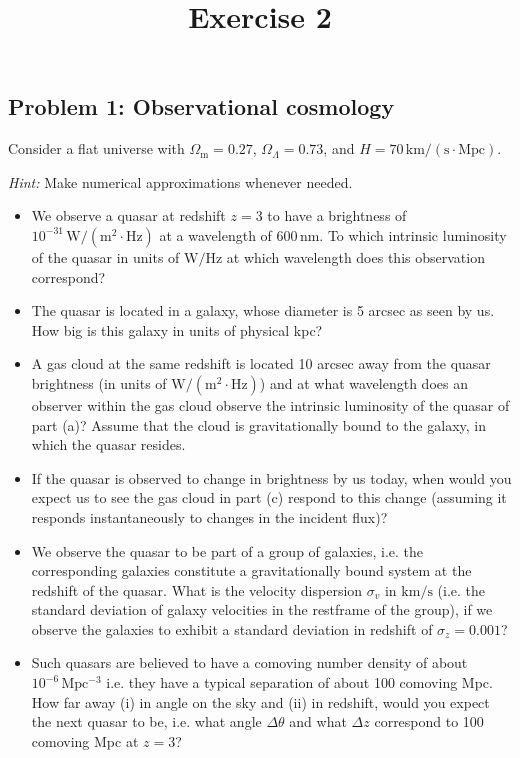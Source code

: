 \documentclass[a4paper]{article}
\begin{document}
\title{\textbf{Exercise 2}}
\author{}
\date{}

\maketitle

\subsection*{Problem 1: Observational cosmology}

Consider a flat universe with $\Omega_\mathrm{m}=0.27$, $\Omega_\Lambda=0.73$, and $H=70\,\mathrm{km/(s\cdot Mpc)}$.

\textit{Hint:} Make numerical approximations whenever needed.

\begin{itemize}
    \item[(a)] We observe a quasar at redshift $z=3$ to have a brightness of $10^{-31}\,\mathrm{W/(m^2\cdot Hz)}$ at a wavelength of $600\,\mathrm{nm}$. To which intrinsic luminosity of the quasar in units of $\mathrm{W/Hz}$ at which wavelength does this observation correspond?
    
    \item[(b)] The quasar is located in a galaxy, whose diameter is 5 arcsec as seen by us. How big is this galaxy in units of physical kpc?
    
    \item[(c)] A gas cloud at the same redshift is located 10 arcsec away from the quasar brightness (in units of $\mathrm{W/(m^2\cdot Hz)}$) and at what wavelength does an observer within the gas cloud observe the intrinsic luminosity of the quasar of part (a)? Assume that the cloud is gravitationally bound to the galaxy, in which the quasar resides.
    
    \item[(d)] If the quasar is observed to change in brightness by us today, when would you expect us to see the gas cloud in part (c) respond to this change (assuming it responds instantaneously to changes in the incident flux)?
    
    \item[(e)] We observe the quasar to be part of a group of galaxies, i.e. the corresponding galaxies constitute a gravitationally bound system at the redshift of the quasar. What is the velocity dispersion $\sigma_v$ in $\mathrm{km/s}$ (i.e. the standard deviation of galaxy velocities in the restframe of the group), if we observe the galaxies to exhibit a standard deviation in redshift of $\sigma_z=0.001$?
    
    \item[(f)] Such quasars are believed to have a comoving number density of about $10^{-6}\,\mathrm{Mpc^{-3}}$
    i.e. they have a typical separation of about 100 comoving Mpc. How far away (i) in angle on the sky and (ii) in redshift, would you expect the next quasar to be, i.e. what angle $\Delta\theta$ and what $\Delta z$ correspond to 100 comoving Mpc at $z=3$?
\end{itemize}
\end{document}
